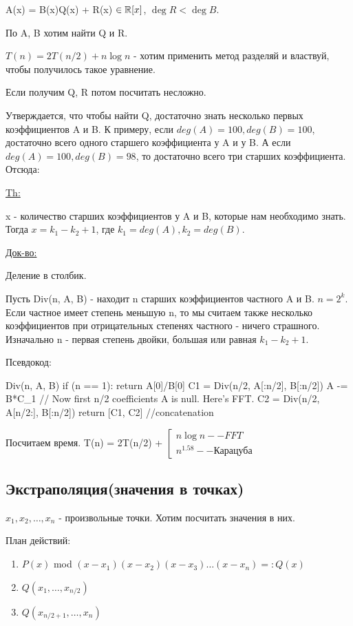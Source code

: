 A(x) = B(x)Q(x) + R(x) $\in \mathbb{R}[x]$, $\deg R < \deg B$.

По A, B хотим найти Q и R.

$T(n) = 2T(n/2) + n \log n$ - хотим применить метод разделяй и властвуй, чтобы получилось такое уравнение.

Если получим Q, R потом посчитать несложно.

Утверждается, что чтобы найти Q, достаточно знать несколько первых коэффициентов A и B. К примеру, если $deg(A) = 100, deg(B) = 100$, достаточно всего одного старшего коэффициента у A и у B. А если $deg(A) = 100, deg(B) = 98$, то достаточно всего три старших коэффициента. Отсюда:

\underline{Th:}

x - количество старших коэффициентов у A и B, которые нам необходимо знать. Тогда $x = k_1 - k_2 + 1$, где $k_1 = deg(A), k_2 = deg(B)$.

\underline{Док-во:}

Деление в столбик.

Пусть Div(n, A, B) - находит n старших коэффициентов частного A и B. $n = 2^k$. Если частное имеет степень меньшую n, то мы считаем также несколько коэффициентов при отрицательных степенях частного - ничего страшного. Изначально n - первая степень двойки, большая или равная $k_1 - k_2 + 1$.

Псевдокод:

\begin{cppcode}
Div(n, A, B) {
	if (n == 1): return A[0]/B[0]
	C1 = Div(n/2, A[:n/2], B[:n/2])
	A -= B*C_1 // Now first n/2 coefficients A is null. Here's FFT.
	C2 = Div(n/2, A[n/2:], B[:n/2])
	return [C1, C2] //concatenation 
}
\end{cppcode}

Посчитаем время. T(n) = 2T(n/2) + $\left[ \begin{gathered} 
										n \log n -- FFT \\
										n^{1.58} -- \text{Карацуба}
										\end{gathered}
								\right.$
								
\subsection{Экстраполяция(значения в точках)}

$x_1, x_2, \dots, x_n$ - произвольные точки. Хотим посчитать значения в них.

План действий:
\begin{enumerate}
	\item $P(x)$ mod $(x - x_1)(x - x_2)(x - x_3)\dots(x - x_n) =: Q(x)$
	\item $Q(x_1, \dots, x_{n/2})$
	\item $Q(x_{n/2 + 1}, \dots, x_n)$ 
\end{enumerate}							

